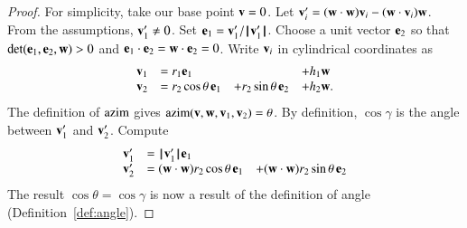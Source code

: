 \begin{proof}  For simplicity,  take our base point $\v=0$.
Let $\v_i' = (\w\cdot \w) \v_i - (\w\cdot \v_i) \w$.  
From the assumptions, $\v_1'\ne 0$.  Set $\e_1 = \v_1'/\normo{\v'_1}$.  Choose a unit vector
$\e_2$ so that $\det(\e_1,\e_2,\w)>0$ and $\e_1\cdot \e_2 = \w\cdot \e_2=0$.
Write $\v_i$ in cylindrical coordinates as 
   $$
   \begin{array}{lllll}
     \v_1 &= r_1 \e_1 &    &+h_1 \w\\
     \v_2 &= r_2 \cos\theta\, \e_1 &+ r_2 \sin\theta\, \e_2 &+ h_2 \w.
    \end{array}
   $$
The definition of $\op{azim}$ gives $\op{azim}(\v,\w,\v_1,\v_2)=\theta$.  
By definition, $\cos\gamma$ is the angle between $\v_1'$ and $\v_2'$.
Compute
   $$
   \begin{array}{lll}
     \v_1' &= \normo{\v'_1} \e_1 \\
     \v_2' &= (\w\cdot \w) r_2 \cos\theta\, \e_1 
       &+ (\w\cdot \w) r_2 \sin\theta\, \e_2 \\
     \end{array}
   $$
The result $\cos\theta=\cos\gamma$ 
is now a result of the definition of angle 
(Definition~\ref{def:angle}).
\end{proof}
%
%





